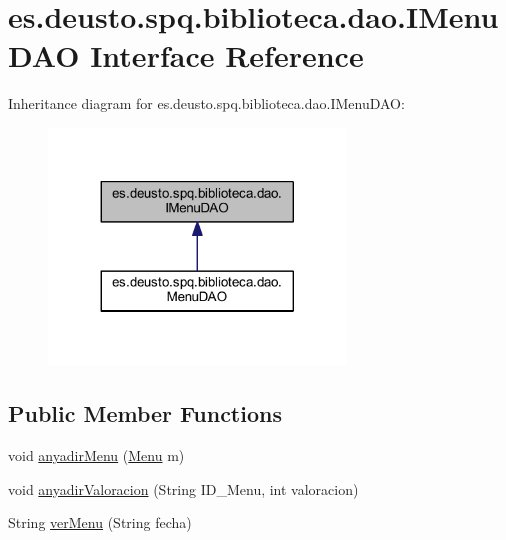 \hypertarget{interfacees_1_1deusto_1_1spq_1_1biblioteca_1_1dao_1_1_i_menu_d_a_o}{}\section{es.\+deusto.\+spq.\+biblioteca.\+dao.\+I\+Menu\+D\+AO Interface Reference}
\label{interfacees_1_1deusto_1_1spq_1_1biblioteca_1_1dao_1_1_i_menu_d_a_o}


Inheritance diagram for es.\+deusto.\+spq.\+biblioteca.\+dao.\+I\+Menu\+D\+AO\+:
\nopagebreak
\begin{figure}[H]
\begin{center}
\leavevmode
\includegraphics[width=224pt]{interfacees_1_1deusto_1_1spq_1_1biblioteca_1_1dao_1_1_i_menu_d_a_o__inherit__graph}
\end{center}
\end{figure}
\subsection*{Public Member Functions}
\begin{DoxyCompactItemize}
\item 
void \mbox{\hyperlink{interfacees_1_1deusto_1_1spq_1_1biblioteca_1_1dao_1_1_i_menu_d_a_o_a1c99a228f8d92ef41cbd3c4aae426eb0}{anyadir\+Menu}} (\mbox{\hyperlink{classes_1_1deusto_1_1spq_1_1biblioteca_1_1data_1_1_menu}{Menu}} m)
\item 
void \mbox{\hyperlink{interfacees_1_1deusto_1_1spq_1_1biblioteca_1_1dao_1_1_i_menu_d_a_o_abd65ad2c5269cd19edc975518bf16b49}{anyadir\+Valoracion}} (String I\+D\+\_\+\+Menu, int valoracion)
\item 
String \mbox{\hyperlink{interfacees_1_1deusto_1_1spq_1_1biblioteca_1_1dao_1_1_i_menu_d_a_o_ac92176efdcf5f320225152392db8cb8a}{ver\+Menu}} (String fecha)
\end{DoxyCompactItemize}


